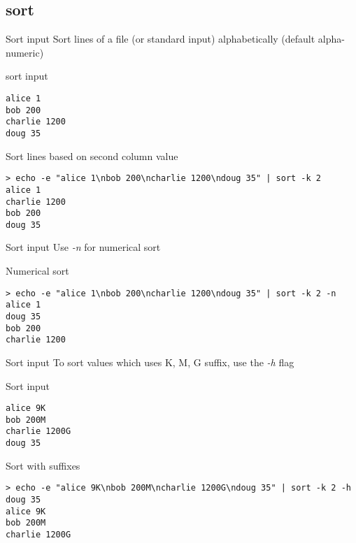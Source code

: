 \subsection{sort}

\begin{frame}[fragile]{Sort input}
Sort lines of a file (or standard input) alphabetically (default alpha-numeric)
  \pause
  \begin{exampleblock}{sort input}
    \begin{lstlisting}[showstringspaces=false,basicstyle=\tiny]
alice 1
bob 200
charlie 1200
doug 35
    \end{lstlisting}
  \end{exampleblock}
  \pause
  \begin{exampleblock}{Sort lines based on second column value}
    \begin{lstlisting}[showstringspaces=false,basicstyle=\tiny]
> echo -e "alice 1\nbob 200\ncharlie 1200\ndoug 35" | sort -k 2
alice 1
charlie 1200
bob 200
doug 35
    \end{lstlisting}
  \end{exampleblock}
\end{frame}

\begin{frame}[fragile]{Sort input}
Use \emph{-n} for numerical sort
  \pause
  \begin{exampleblock}{Numerical sort}
    \begin{lstlisting}[showstringspaces=false,basicstyle=\tiny]
> echo -e "alice 1\nbob 200\ncharlie 1200\ndoug 35" | sort -k 2 -n
alice 1
doug 35
bob 200
charlie 1200
    \end{lstlisting}
  \end{exampleblock}
\end{frame}


\begin{frame}[fragile]{Sort input}
To sort values which uses K, M, G suffix, use the \emph{-h} flag
\pause
  \begin{exampleblock}{Sort input}
    \begin{lstlisting}[showstringspaces=false,basicstyle=\tiny]
alice 9K
bob 200M
charlie 1200G
doug 35
    \end{lstlisting}
  \end{exampleblock}
  \pause
  \begin{exampleblock}{Sort with suffixes}
    \begin{lstlisting}[showstringspaces=false,basicstyle=\tiny]
> echo -e "alice 9K\nbob 200M\ncharlie 1200G\ndoug 35" | sort -k 2 -h
doug 35
alice 9K
bob 200M
charlie 1200G
    \end{lstlisting}
  \end{exampleblock}
\end{frame}
